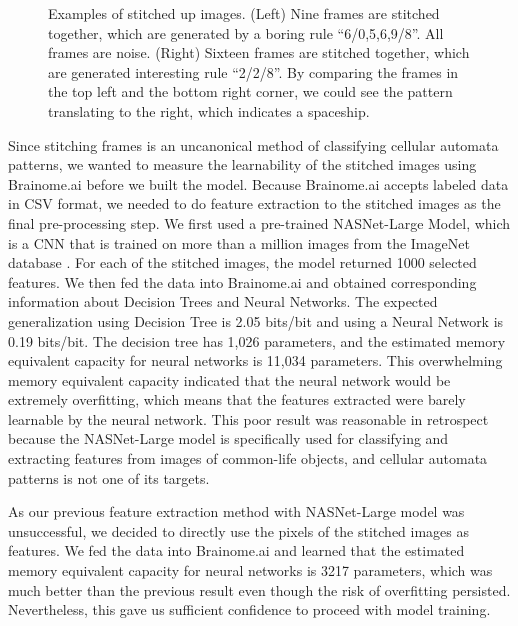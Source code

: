 \documentclass[12pt]{article}
\numberwithin{figure}{section} %
\begin{document}
\begin{figure}[H]
\begin{subfigure}{0.53\textwidth}
   	\end{subfigure}
   	\caption[Examples of stitched images]{Examples of stitched up images. (Left) Nine frames are stitched together, which are generated by a boring rule “6/0,5,6,9/8”. All frames are noise. (Right) Sixteen frames are stitched together, which are generated interesting rule “2/2/8”. By comparing the frames in the top left and the bottom right corner, we could see the pattern translating to the right, which indicates a spaceship.}
   	\vspace{-1.5em}
   	\label{fig:stitched image examples}
\end{figure}

Since stitching frames is an uncanonical method of classifying cellular automata patterns, we wanted to measure the learnability of the stitched images using Brainome.ai \cite{Brainome} before we built the model. Because Brainome.ai accepts labeled data in CSV format, we needed to do feature extraction to the stitched images as the final pre-processing step. We first used a pre-trained NASNet-Large Model, which is a CNN that is trained on more than a million images from the ImageNet database \cite{ImageNet}. For each of the stitched images, the model returned 1000 selected features. We then fed the data into Brainome.ai and obtained corresponding information about Decision Trees and Neural Networks. The expected generalization using Decision Tree is 2.05 bits/bit and using a Neural Network is 0.19 bits/bit.  The decision tree has 1,026 parameters, and the estimated memory equivalent capacity for neural networks is 11,034 parameters. This overwhelming memory equivalent capacity indicated that the neural network would be extremely overfitting, which means that the features extracted were barely learnable by the neural network. This poor result was reasonable in retrospect because the NASNet-Large model is specifically used for classifying and extracting features from images of common-life objects, and cellular automata patterns is not one of its targets. 

As our previous feature extraction method with NASNet-Large model was unsuccessful, we decided to directly use the pixels of the stitched images as features. We fed the data into Brainome.ai and learned that the estimated memory equivalent capacity for neural networks is 3217 parameters, which was much better than the previous result even though the risk of overfitting persisted. Nevertheless, this gave us sufficient confidence to proceed with model training. 
\end{document}

